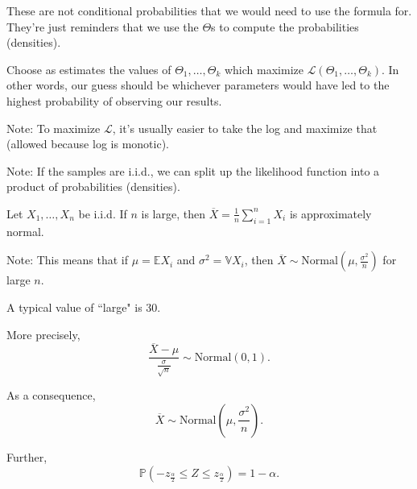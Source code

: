 \documentclass{article}
\begin{document}
    These are not conditional probabilities that we would need to use the formula for. They're just reminders that we use the $\Theta$s to compute the probabilities (densities).

\medskip
{}

    Choose as estimates the values of $\Theta_1, \hdots, \Theta_k$ which maximize $\mathcal L(\Theta_1, \hdots, \Theta_k)$. In other words, our guess should be whichever parameters would have led to the highest probability of observing our results.

    Note: To maximize $\mathcal L$, it's usually easier to take the log and maximize that (allowed because log is monotic).

    Note: If the samples are i.i.d., we can split up the likelihood function into a product of probabilities (densities).

\medskip
{}

    Let $X_1, \hdots, X_n$ be i.i.d. If $n$ is large, then $\overline X = \frac1n\sum\limits_{i=1}^nX_i$ is approximately normal.

    Note: This means that if $\mu = \mathbb EX_i$ and $\sigma^2 = \mathbb VX_i$, then $\overline X \sim \text{Normal}(\mu, \frac{\sigma^2}n)$ for large $n$.

    A typical value of ``large" is 30.

    More precisely, \[\frac{\overline X - \mu}{\frac{\sigma}{\sqrt n}} \sim \text{Normal}(0,1).\]

    As a consequence, \[\overline X \sim \text{Normal}(\mu, \frac{\sigma^2}{n}).\]

    Further, \[\mathbb P(-z_{\frac\alpha2} \leq Z \leq z_{\frac\alpha2}) = 1 - \alpha.\]
\end{document}
